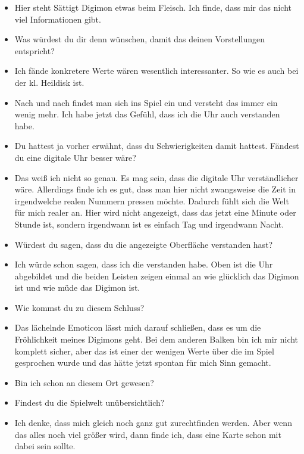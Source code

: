{\begin{itemize}[]
    \item {} Hier steht \frq  Sättigt Digimon etwas\flq{} beim Fleisch. Ich finde, dass mir das nicht viel Informationen gibt.
    \item {} Was würdest du dir denn wünschen, damit das deinen Vorstellungen entspricht?
    \item {} Ich fände konkretere Werte wären wesentlich interessanter. So wie es auch bei der \frq  kl. Heildisk\flq{} ist.
    \item {} Nach und nach findet man sich ins Spiel ein und versteht das immer ein wenig mehr. Ich habe jetzt das Gefühl, dass ich die Uhr auch verstanden habe.
    \item {} Du hattest ja vorher erwähnt, dass du Schwierigkeiten damit hattest. Fändest du eine digitale Uhr besser wäre?
    \item {} Das weiß ich nicht so genau. Es mag sein, dass die digitale Uhr verständlicher wäre. Allerdings finde ich es gut, dass man hier nicht zwangsweise die Zeit in irgendwelche realen Nummern pressen möchte. Dadurch fühlt sich die Welt für mich realer an. Hier wird nicht angezeigt, dass das jetzt eine Minute oder Stunde ist, sondern irgendwann ist es einfach Tag und irgendwann Nacht. 
    \item {} Würdest du sagen, dass du die angezeigte Oberfläche verstanden hast?
    \item {} Ich würde schon sagen, dass ich die verstanden habe. Oben ist die Uhr abgebildet und die beiden Leisten zeigen einmal an wie glücklich das Digimon ist und wie müde das Digimon ist.
    \item {} Wie kommst du zu diesem Schluss?
    \item {} Das lächelnde Emoticon lässt mich darauf schließen, dass es um die Fröhlichkeit meines Digimons geht. Bei dem anderen Balken bin ich mir nicht komplett sicher, aber das ist einer der wenigen Werte über die im Spiel gesprochen wurde und das hätte jetzt spontan für mich Sinn gemacht. 
    \item {} Bin ich schon an diesem Ort gewesen?
    \item {} Findest du die Spielwelt unübersichtlich?
    \item {} Ich denke, dass mich gleich noch ganz gut zurechtfinden werden. Aber wenn das alles noch viel größer wird, dann finde ich, dass eine Karte schon mit dabei sein sollte.

\end{itemize}}
